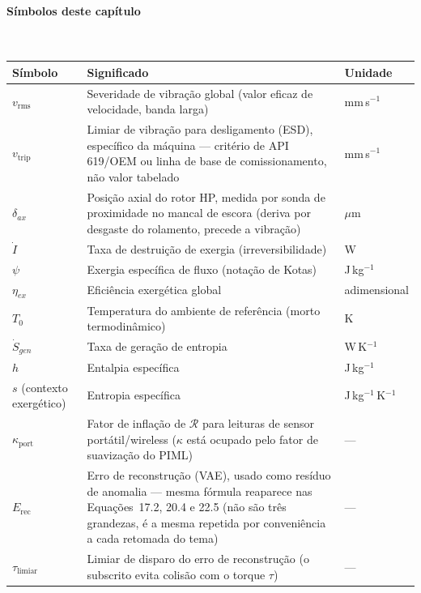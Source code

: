 \documentclass[12pt,a4paper]{article}
\numberwithin{equation}{section}
\numberwithin{table}{section}
\numberwithin{figure}{section}
\begin{document}
\paragraph{Símbolos deste capítulo}\mbox{}\\[-0.5em]
{\small
\begin{longtable}{>{\raggedright\arraybackslash}p{2.6cm} >{\raggedright\arraybackslash}p{9.2cm} >{\raggedright\arraybackslash}p{2.6cm}}
	\toprule
	\textbf{Símbolo} & \textbf{Significado} & \textbf{Unidade} \\ \midrule
	\endhead
	$v_{\text{rms}}$ & Severidade de vibração global (valor eficaz de velocidade, banda larga) & mm\,s$^{-1}$ \\
	$v_{\text{trip}}$ & Limiar de vibração para desligamento (ESD), específico da máquina — critério de API 619/OEM ou linha de base de comissionamento, não valor tabelado & mm\,s$^{-1}$ \\
	$\delta_{ax}$ & Posição axial do rotor HP, medida por sonda de proximidade no mancal de escora (deriva por desgaste do rolamento, precede a vibração) & $\mu$m \\
	$\dot{I}$ & Taxa de destruição de exergia (irreversibilidade) & W \\
	$\psi$\dag & Exergia específica de fluxo (notação de Kotas) & J\,kg$^{-1}$ \\
	$\eta_{ex}$ & Eficiência exergética global & adimensional \\
	$T_0$ & Temperatura do ambiente de referência (morto termodinâmico) & K \\
	$\dot{S}_{gen}$ & Taxa de geração de entropia & W\,K$^{-1}$ \\
	$h$ & Entalpia específica & J\,kg$^{-1}$ \\
	$s$ (contexto exergético) & Entropia específica & J\,kg$^{-1}$\,K$^{-1}$ \\
	$\kappa_{\text{port}}$\dag & Fator de inflação de $\mathcal{R}$ para leituras de sensor portátil/wireless ($\kappa$ está ocupado pelo fator de suavização do PIML) & --- \\
	$E_{\text{rec}}$ & Erro de reconstrução (VAE), usado como resíduo de anomalia — mesma fórmula reaparece nas Equações~17.2, 20.4 e 22.5 (não são três grandezas, é a mesma repetida por conveniência a cada retomada do tema) & --- \\
	$\tau_{\text{limiar}}$\dag & Limiar de disparo do erro de reconstrução (o subscrito evita colisão com o torque $\tau$) & --- \\
	\bottomrule
\end{longtable}
}
\end{document}
